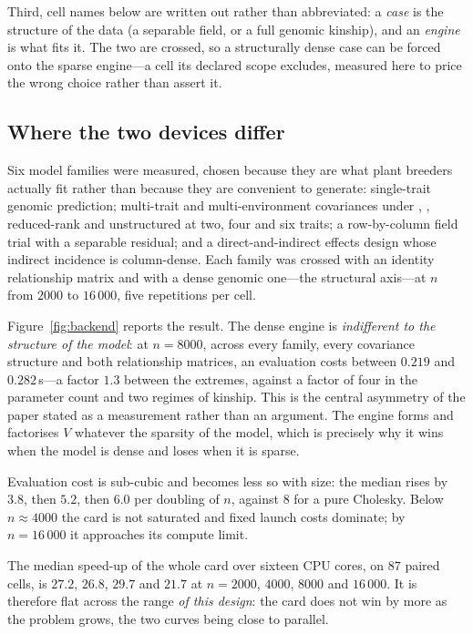 \documentclass[article]{jss}
\begin{document}
Third, cell names below are written out rather than abbreviated: a
\emph{case} is the structure of the data (a separable  field, or a
full genomic kinship), and an \emph{engine} is what fits it. The two are
crossed, so a structurally dense case can be forced onto the sparse engine---a
cell its declared scope excludes, measured here to price the wrong choice
rather than assert it.

\subsection{Where the two devices differ}\label{sec:paired}

Six model families were measured, chosen because they are what plant breeders
actually fit rather than because they are convenient to generate: single-trait
genomic prediction; multi-trait and multi-environment covariances under
, , reduced-rank  and unstructured  at
two, four and six traits; a row-by-column field trial with a separable
 residual; and a direct-and-indirect effects design whose indirect
incidence is column-dense. Each family was crossed with an identity
relationship matrix and with a dense genomic one---the structural axis---at
$n$ from $2000$ to $16\,000$, five repetitions per cell.

Figure~\ref{fig:backend} reports the result. The dense engine is
\emph{indifferent to the structure of the model}: at $n = 8000$, across every
family, every covariance structure and both relationship matrices, an
evaluation costs between $0.219$ and $0.282$\,s---a factor $1.3$ between the
extremes, against a factor of four in the parameter count and two regimes of
kinship. This is the central asymmetry of the paper stated as a measurement
rather than an argument. The engine forms and factorises $V$ whatever the
sparsity of the model, which is precisely why it wins when the model is dense
and loses when it is sparse.

Evaluation cost is sub-cubic and becomes less so with size: the median rises
by $3.8$, then $5.2$, then $6.0$ per doubling of $n$, against $8$ for a pure
Cholesky. Below $n \approx 4000$ the card is not saturated and fixed launch
costs dominate; by $n = 16\,000$ it approaches its compute limit.

The median speed-up of the whole card over sixteen CPU cores, on $87$ paired
cells, is $27.2$, $26.8$, $29.7$ and $21.7$ at $n = 2000$, $4000$, $8000$ and
$16\,000$. It is therefore flat across the range \emph{of this design}: the card does not
win by more as the problem grows, the two curves being close to parallel.
\end{document}
